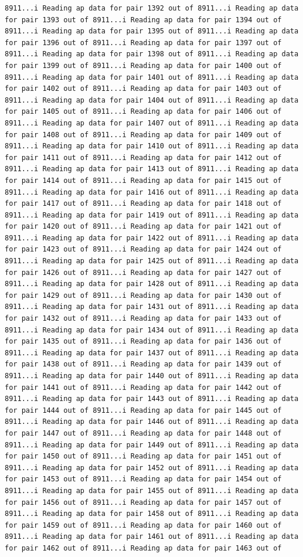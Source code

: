 \documentclass[
]{article}
\begin{document}
\begin{verbatim}
8911...i Reading ap data for pair 1392 out of 8911...i Reading ap data for pair 1393 out of 8911...i Reading ap data for pair 1394 out of 8911...i Reading ap data for pair 1395 out of 8911...i Reading ap data for pair 1396 out of 8911...i Reading ap data for pair 1397 out of 8911...i Reading ap data for pair 1398 out of 8911...i Reading ap data for pair 1399 out of 8911...i Reading ap data for pair 1400 out of 8911...i Reading ap data for pair 1401 out of 8911...i Reading ap data for pair 1402 out of 8911...i Reading ap data for pair 1403 out of 8911...i Reading ap data for pair 1404 out of 8911...i Reading ap data for pair 1405 out of 8911...i Reading ap data for pair 1406 out of 8911...i Reading ap data for pair 1407 out of 8911...i Reading ap data for pair 1408 out of 8911...i Reading ap data for pair 1409 out of 8911...i Reading ap data for pair 1410 out of 8911...i Reading ap data for pair 1411 out of 8911...i Reading ap data for pair 1412 out of 8911...i Reading ap data for pair 1413 out of 8911...i Reading ap data for pair 1414 out of 8911...i Reading ap data for pair 1415 out of 8911...i Reading ap data for pair 1416 out of 8911...i Reading ap data for pair 1417 out of 8911...i Reading ap data for pair 1418 out of 8911...i Reading ap data for pair 1419 out of 8911...i Reading ap data for pair 1420 out of 8911...i Reading ap data for pair 1421 out of 8911...i Reading ap data for pair 1422 out of 8911...i Reading ap data for pair 1423 out of 8911...i Reading ap data for pair 1424 out of 8911...i Reading ap data for pair 1425 out of 8911...i Reading ap data for pair 1426 out of 8911...i Reading ap data for pair 1427 out of 8911...i Reading ap data for pair 1428 out of 8911...i Reading ap data for pair 1429 out of 8911...i Reading ap data for pair 1430 out of 8911...i Reading ap data for pair 1431 out of 8911...i Reading ap data for pair 1432 out of 8911...i Reading ap data for pair 1433 out of 8911...i Reading ap data for pair 1434 out of 8911...i Reading ap data for pair 1435 out of 8911...i Reading ap data for pair 1436 out of 8911...i Reading ap data for pair 1437 out of 8911...i Reading ap data for pair 1438 out of 8911...i Reading ap data for pair 1439 out of 8911...i Reading ap data for pair 1440 out of 8911...i Reading ap data for pair 1441 out of 8911...i Reading ap data for pair 1442 out of 8911...i Reading ap data for pair 1443 out of 8911...i Reading ap data for pair 1444 out of 8911...i Reading ap data for pair 1445 out of 8911...i Reading ap data for pair 1446 out of 8911...i Reading ap data for pair 1447 out of 8911...i Reading ap data for pair 1448 out of 8911...i Reading ap data for pair 1449 out of 8911...i Reading ap data for pair 1450 out of 8911...i Reading ap data for pair 1451 out of 8911...i Reading ap data for pair 1452 out of 8911...i Reading ap data for pair 1453 out of 8911...i Reading ap data for pair 1454 out of 8911...i Reading ap data for pair 1455 out of 8911...i Reading ap data for pair 1456 out of 8911...i Reading ap data for pair 1457 out of 8911...i Reading ap data for pair 1458 out of 8911...i Reading ap data for pair 1459 out of 8911...i Reading ap data for pair 1460 out of 8911...i Reading ap data for pair 1461 out of 8911...i Reading ap data for pair 1462 out of 8911...i Reading ap data for pair 1463 out of 
\end{verbatim}
\end{document}
